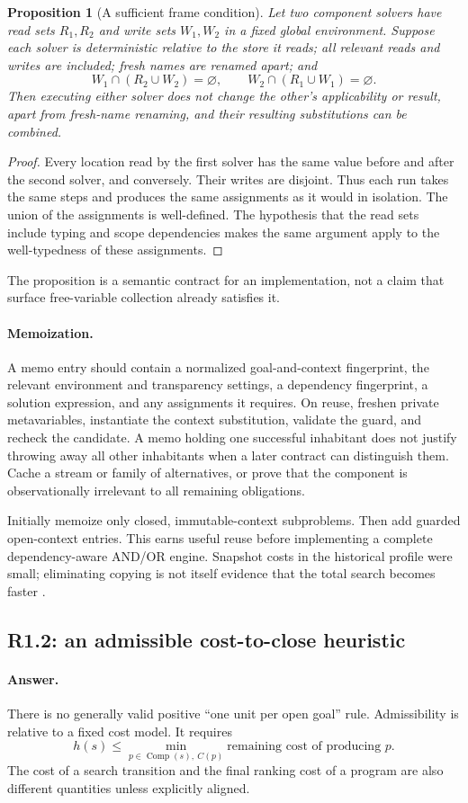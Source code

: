 \documentclass[11pt,a4paper]{article}
\newcommand{\Comp}{\operatorname{Comp}}
\newcommand{\answer}{\paragraph{Answer.}}
\newtheorem{proposition}{Proposition}[section]
\theoremstyle{definition}
\theoremstyle{remark}
\begin{document}
\begin{proposition}[A sufficient frame condition]\label{prop:frame}
Let two component solvers have read sets $R_1,R_2$ and write sets $W_1,W_2$ in a
fixed global environment. Suppose each solver is deterministic relative to the
store it reads; all relevant reads and writes are included; fresh names are
renamed apart; and
\[
 W_1\cap(R_2\cup W_2)=\varnothing,
 \qquad W_2\cap(R_1\cup W_1)=\varnothing.
\]
Then executing either solver does not change the other's applicability or
result, apart from fresh-name renaming, and their resulting substitutions can
be combined.
\end{proposition}
\begin{proof}
Every location read by the first solver has the same value before and after the
second solver, and conversely. Their writes are disjoint. Thus each run takes
the same steps and produces the same assignments as it would in isolation.
The union of the assignments is well-defined. The hypothesis that the read
sets include typing and scope dependencies makes the same argument apply to
the well-typedness of these assignments.
\end{proof}
The proposition is a semantic contract for an implementation, not a claim that
surface free-variable collection already satisfies it.

\paragraph{Memoization.}
A memo entry should contain a normalized goal-and-context fingerprint, the
relevant environment and transparency settings, a dependency fingerprint, a
solution expression, and any assignments it requires. On reuse, freshen private
metavariables, instantiate the context substitution, validate the guard, and
recheck the candidate. A memo holding one successful inhabitant does not justify
throwing away all other inhabitants when a later contract can distinguish them.
Cache a stream or family of alternatives, or prove that the component is
observationally irrelevant to all remaining obligations.

Initially memoize only closed, immutable-context subproblems. Then add guarded
open-context entries. This earns useful reuse before implementing a complete
dependency-aware AND/OR engine. Snapshot costs in the historical profile were
small; eliminating copying is not itself evidence that the total search becomes
faster \cite{repo}.

\subsection{R1.2: an admissible cost-to-close heuristic}
\answer There is no generally valid positive ``one unit per open goal'' rule.
Admissibility is relative to a fixed cost model. It requires
\[
 h(s)\leq\min_{p\in\Comp(s),\ C(p)}
       \text{remaining cost of producing }p.
\]
The cost of a search transition and the final ranking cost of a program are
also different quantities unless explicitly aligned.
\end{document}
